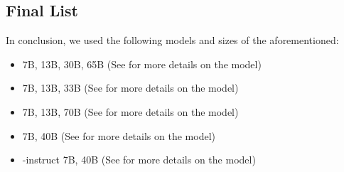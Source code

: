\subsection{Final List}\label{sub:list}
In conclusion, we used the following models and sizes of the aforementioned:
\begin{itemize}
    \item {} 7B, 13B, 30B, 65B (See  for more details on the model)
    \item {} 7B, 13B, 33B (See  for more details on the model)
    \item {} 7B, 13B, 70B (See  for more details on the model)
    \item {} 7B, 40B (See  for more details on the model)
    \item {}-instruct 7B, 40B (See  for more details on the model)
\end{itemize}

